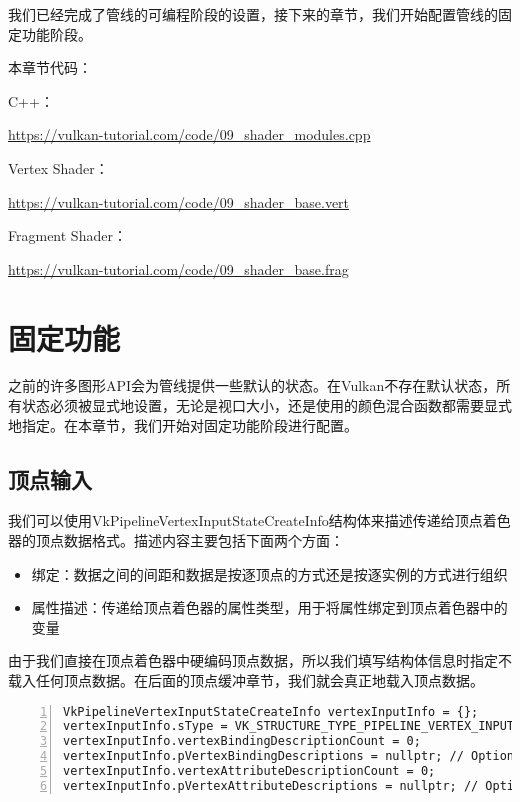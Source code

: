 \documentclass{ctexart}
\begin{document}
我们已经完成了管线的可编程阶段的设置，接下来的章节，我们开始配置管线的固定功能阶段。

本章节代码：

C++：

\url{https://vulkan-tutorial.com/code/09_shader_modules.cpp}

Vertex Shader：

\url{https://vulkan-tutorial.com/code/09_shader_base.vert}

Fragment Shader：

\url{https://vulkan-tutorial.com/code/09_shader_base.frag}

\newpage
\section{固定功能}

之前的许多图形API会为管线提供一些默认的状态。在Vulkan不存在默认状态，所有状态必须被显式地设置，无论是视口大小，还是使用的颜色混合函数都需要显式地指定。在本章节，我们开始对固定功能阶段进行配置。

\subsection{顶点输入}

我们可以使用VkPipelineVertexInputStateCreateInfo结构体来描述传递给顶点着色器的顶点数据格式。描述内容主要包括下面两个方面：

\begin{itemize}
	\item 绑定：数据之间的间距和数据是按逐顶点的方式还是按逐实例的方式进行组织
	\item 属性描述：传递给顶点着色器的属性类型，用于将属性绑定到顶点着色器中的变量
\end{itemize}

由于我们直接在顶点着色器中硬编码顶点数据，所以我们填写结构体信息时指定不载入任何顶点数据。在后面的顶点缓冲章节，我们就会真正地载入顶点数据。

\begin{lstlisting}[language={[ANSI]C},keywordstyle=\color{blue!70},commentstyle=\color{red!50!green!50!blue!50},frame=shadowbox, rulesepcolor=\color{red!20!green!20!blue!20},basicstyle=\small,numbers=left, numberstyle=\tiny,breaklines=true]
VkPipelineVertexInputStateCreateInfo vertexInputInfo = {};
vertexInputInfo.sType = VK_STRUCTURE_TYPE_PIPELINE_VERTEX_INPUT_STATE_CREATE_INFO;
vertexInputInfo.vertexBindingDescriptionCount = 0;
vertexInputInfo.pVertexBindingDescriptions = nullptr; // Optional
vertexInputInfo.vertexAttributeDescriptionCount = 0;
vertexInputInfo.pVertexAttributeDescriptions = nullptr; // Optional
\end{lstlisting}
\end{document}
